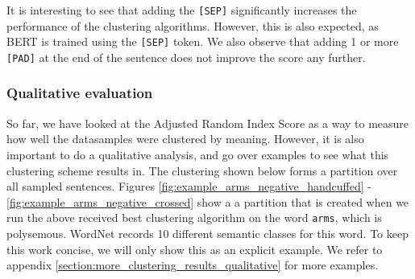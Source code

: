 \documentclass[a4paper,12pt,oneside,openright]{report}
\begin{document}
It is interesting to see that adding the \Verb#[SEP]# significantly increases the performance of the clustering algorithms.
However, this is also expected, as BERT is trained using the \Verb#[SEP]# token.
We also observe that adding 1 or more \Verb#[PAD]# at the end of the sentence does not improve the score any further. \\

\subsubsection{Qualitative evaluation}

So far, we have looked at the Adjusted Random Index Score as a way to measure how well the datasamples were clustered by meaning.
However, it is also important to do a qualitative analysis, and go over examples to see what this clustering scheme results in.
The clustering shown below forms a partition over all sampled sentences.
Figures \ref{fig:example_arms_negative_handcuffed} - \ref{fig:example_arms_negative_crossed} show a a partition that is created when we run the above received best clustering algorithm on the word \Verb#arms#, which is polysemous. 
WordNet records 10 different semantic classes for this word.
To keep this work concise, we will only show this as an explicit example. 
We refer to appendix \ref{section:more_clustering_results_qualitative} for  more examples.
\\
\end{document}
